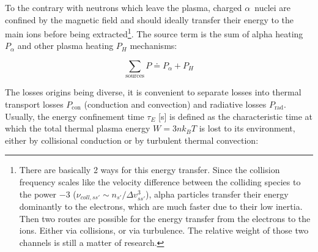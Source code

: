 To the contrary with neutrons which leave the plasma, charged $\alpha$~nuclei are confined by the magnetic field and should ideally transfer their energy to the main ions before being extracted\footnote{There are basically 2 ways for this energy transfer. Since the collision frequency scales like the velocity difference between the colliding species to the power $-3$ ($\nu_{coll,ss'}\sim n_{s'}/\Delta v_{ss'}^3$), alpha particles transfer their energy dominantly to the electrons, which are much faster due to their low inertia. Then two routes are possible for the energy transfer from the electrons to the ions. Either via collisions, or via turbulence. The relative weight of those two channels is still a matter of research.}. The source term is the sum of alpha heating $P_\alpha$ and other plasma heating $P_{H}$ mechanisms:

\begin{equation}
\sum_{\mathrm{sources}} P
	\doteq 
	P_\alpha + P_{H} 
	\label{eq:sources}
\end{equation}

The losses origins being diverse, it is convenient to separate losses into thermal transport losses $P_{\mathrm{con}}$ (conduction and convection) and radiative losses $P_{\mathrm{rad}}$. Usually, the energy confinement time $\tau_E$ [\si{s}] is defined as the characteristic time at which the total thermal plasma energy $W=3 n k_B T$ is lost to its environment, either by collisional conduction or by turbulent thermal convection:


